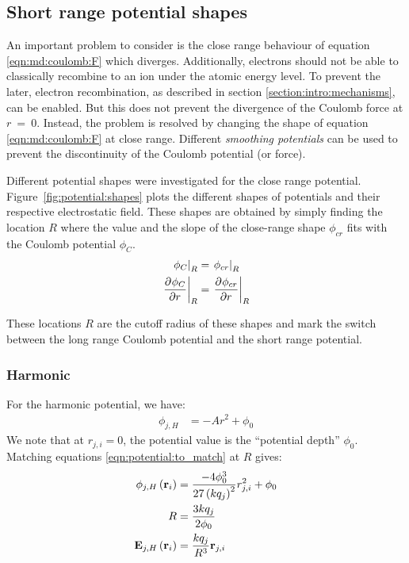 \subsection{Short range potential shapes}
\label{section:intro:md:potentials}

An important problem to consider is the close range behaviour of equation
\eqref{eqn:md:coulomb:F} which diverges. Additionally, electrons should not be
able to classically recombine to an ion under the atomic energy level. To
prevent the later, electron recombination, as described in section
\ref{section:intro:mechanisms}, can be enabled. But this does not prevent
the divergence of the Coulomb force at $r~=~0$. Instead, the problem is resolved by
changing the shape of equation \eqref{eqn:md:coulomb:F} at close range.
Different \textit{smoothing potentials} can be used to prevent the
discontinuity of the Coulomb potential (or force).


Different potential shapes were investigated for the close range potential.
Figure~\ref{fig:potential:shapes} plots the different shapes of potentials and
their respective electrostatic field. These shapes are obtained by simply
finding the location $R$ where the value and the slope of the close-range shape
$\phi_{cr}$ fits with the Coulomb potential $\phi_C$.
\begin{subequations}
\begin{align}
\left. \phi_C        \right|_{R} & = \left. \phi_{cr} \right|_{R} \\
\left. \frac{\partial^{{}} \phi_C}{\partial r^{{}}} \right|_{R} & = \left. \frac{\partial^{{}} \phi_{cr}}{\partial r^{{}}} \right|_{R}
\end{align}
\label{eqn:potential:to_match}
\end{subequations}

These locations $R$ are the cutoff radius of these shapes and mark the switch
between the long range Coulomb potential and the short range potential.


\subsubsection{Harmonic}

For the harmonic potential, we have:
\begin{align}
\phi_{j,H} & = -A r^2 + \phi_0
\end{align}
We note that at $r_{j,i} = 0$, the potential value is the ``potential depth''
$\phi_0$.
Matching equations \eqref{eqn:potential:to_match} at $R$ gives:
\begin{subequations}
\begin{align}
\phi_{j,H}\left( \textbf{r}_i \right) & = \frac{-4 \phi_0^3}{27 \left( k q_j \right)^2} r_{j,i}^2 + \phi_0
\\
R & = \frac{3 k q_j}{2 \phi_0} \\
\textbf{E}_{j,H}\left( \textbf{r}_i \right) & = \frac{k q_j}{R^3} \textbf{r}_{j,i}
\end{align}
\end{subequations}


